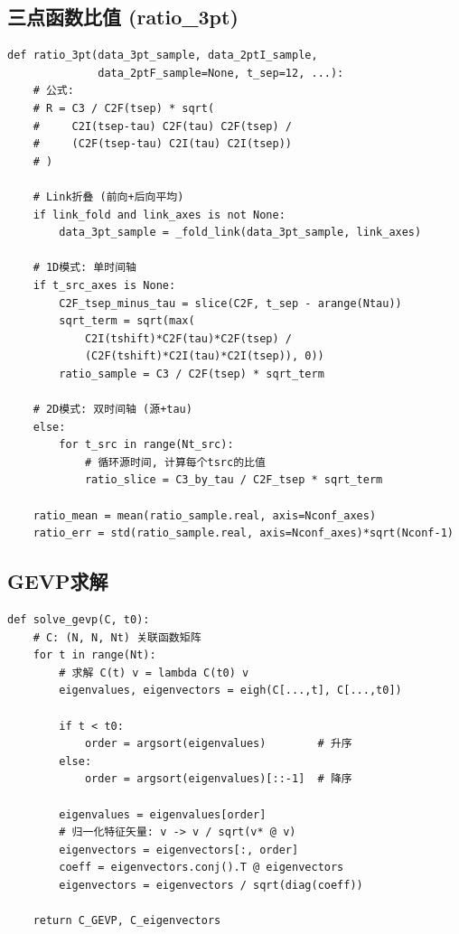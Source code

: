 \documentclass[11pt,a4paper]{ctexart}
\begin{document}
\subsection{三点函数比值 (ratio\_3pt)}

\begin{codebox}
\begin{lstlisting}[style=python]
def ratio_3pt(data_3pt_sample, data_2ptI_sample,
              data_2ptF_sample=None, t_sep=12, ...):
    # 公式:
    # R = C3 / C2F(tsep) * sqrt(
    #     C2I(tsep-tau) C2F(tau) C2F(tsep) /
    #     (C2F(tsep-tau) C2I(tau) C2I(tsep))
    # )

    # Link折叠 (前向+后向平均)
    if link_fold and link_axes is not None:
        data_3pt_sample = _fold_link(data_3pt_sample, link_axes)

    # 1D模式: 单时间轴
    if t_src_axes is None:
        C2F_tsep_minus_tau = slice(C2F, t_sep - arange(Ntau))
        sqrt_term = sqrt(max(
            C2I(tshift)*C2F(tau)*C2F(tsep) /
            (C2F(tshift)*C2I(tau)*C2I(tsep)), 0))
        ratio_sample = C3 / C2F(tsep) * sqrt_term

    # 2D模式: 双时间轴 (源+tau)
    else:
        for t_src in range(Nt_src):
            # 循环源时间, 计算每个tsrc的比值
            ratio_slice = C3_by_tau / C2F_tsep * sqrt_term

    ratio_mean = mean(ratio_sample.real, axis=Nconf_axes)
    ratio_err = std(ratio_sample.real, axis=Nconf_axes)*sqrt(Nconf-1)
\end{lstlisting}
\end{codebox}

\subsection{GEVP求解}

\begin{codebox}
\begin{lstlisting}[style=python]
def solve_gevp(C, t0):
    # C: (N, N, Nt) 关联函数矩阵
    for t in range(Nt):
        # 求解 C(t) v = lambda C(t0) v
        eigenvalues, eigenvectors = eigh(C[...,t], C[...,t0])

        if t < t0:
            order = argsort(eigenvalues)        # 升序
        else:
            order = argsort(eigenvalues)[::-1]  # 降序

        eigenvalues = eigenvalues[order]
        # 归一化特征矢量: v -> v / sqrt(v* @ v)
        eigenvectors = eigenvectors[:, order]
        coeff = eigenvectors.conj().T @ eigenvectors
        eigenvectors = eigenvectors / sqrt(diag(coeff))

    return C_GEVP, C_eigenvectors
\end{lstlisting}
\end{codebox}
\end{document}
